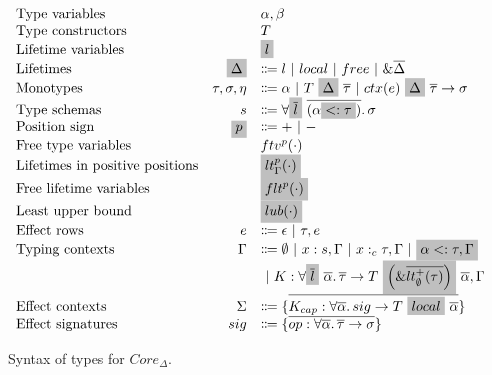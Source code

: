\documentclass[acmsmall,review,screen]{acmart}
\newcommand{\graybox}[1]{\colorbox{lightgray}{$\displaystyle #1$}}
\newcommand{\vor}{~|~}
\newcommand{\ap}{~}
\newcommand{\ctx}[1]{ctx(#1)~}
\begin{document}
\begin{figure}
    \[
        \begin{array}{lrl}
            \text{Type variables} && \alpha, \beta \\
            \text{Type constructors} && T \\
            \text{Lifetime variables} && \graybox{l} \\
            \text{Lifetimes} & \graybox{\Delta} &\Coloneqq l \vor local \vor free \vor \&\overline{\Delta} \\
            \text{Monotypes} & \tau, \sigma, \eta &\Coloneqq \alpha \vor T \ap \graybox{\Delta} \ap \overline{\tau} \vor \ctx{e} \graybox{\Delta}~\overline{\tau} \to \sigma \\
            \text{Type schemas} & s &\Coloneqq \forall \graybox{\overline{l}}~\overline{(\alpha \graybox{<: \tau})}\ldotp \sigma \\
            \text{Position sign} & \graybox{p} & \Coloneqq + \vor - \\
            \text{Free type variables} & & ftv^p(\cdot) \\
            \text{Lifetimes in positive positions} & & \graybox{lt_\Gamma^p(\cdot)} \\
            \text{Free lifetime variables} & & \graybox{flt^p(\cdot)} \\
            \text{Least upper bound} & & \graybox{lub(\cdot)} \\
            \text{Effect rows} & e &\Coloneqq \epsilon\vor \tau, e \\
            \text{Typing contexts} & \Gamma &\Coloneqq \emptyset \vor x : s, \Gamma \vor x :_c \tau, \Gamma \vor \graybox{\alpha <: \tau, \Gamma} \\
            & &\vor K : \forall\graybox{\overline{l}}\ \overline{\alpha}\ldotp \overline{\tau}\to T \ap\graybox{\left(\&\overline{lt_\emptyset^+(\tau)}\right)}\ap \overline{\alpha}, \Gamma \\
            \text{Effect contexts} & \Sigma &\Coloneqq \{\overline{K_{cap} : \forall\overline{\alpha}\ldotp sig\to T\ap \graybox{local} \ap\overline{\alpha}}\} \\
            \text{Effect signatures} & sig &\Coloneqq \{\overline{op : \forall\overline{\alpha}\ldotp\overline{\tau}\to\sigma}\}
        \end{array}
    \]
    \caption{Syntax of types for $Core_\Delta$.}
    \label{fig:core-delta-syntax}
\end{figure}
\end{document}
